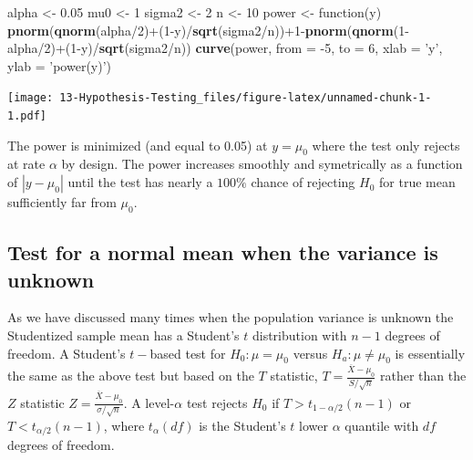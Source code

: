 \documentclass[]{book}
\newenvironment{Shaded}{\begin{snugshade}}{\end{snugshade}}
\newcommand{\KeywordTok}[1]{\textcolor[rgb]{0.13,0.29,0.53}{\textbf{{#1}}}}
\newcommand{\DataTypeTok}[1]{\textcolor[rgb]{0.13,0.29,0.53}{{#1}}}
\newcommand{\DecValTok}[1]{\textcolor[rgb]{0.00,0.00,0.81}{{#1}}}
\newcommand{\FloatTok}[1]{\textcolor[rgb]{0.00,0.00,0.81}{{#1}}}
\newcommand{\StringTok}[1]{\textcolor[rgb]{0.31,0.60,0.02}{{#1}}}
\newcommand{\NormalTok}[1]{{#1}}
\begin{document}
\begin{Shaded}
\begin{Highlighting}[]
\NormalTok{alpha <-}\StringTok{ }\FloatTok{0.05}
\NormalTok{mu0 <-}\StringTok{ }\DecValTok{1}
\NormalTok{sigma2 <-}\StringTok{ }\DecValTok{2}
\NormalTok{n <-}\StringTok{ }\DecValTok{10}
\NormalTok{power <-}\StringTok{ }\NormalTok{function(y) }\KeywordTok{pnorm}\NormalTok{(}\KeywordTok{qnorm}\NormalTok{(alpha/}\DecValTok{2}\NormalTok{)+(}\DecValTok{1}\NormalTok{-y)/}\KeywordTok{sqrt}\NormalTok{(sigma2/n))+}\DecValTok{1}\NormalTok{-}\KeywordTok{pnorm}\NormalTok{(}\KeywordTok{qnorm}\NormalTok{(}\DecValTok{1}\NormalTok{-alpha/}\DecValTok{2}\NormalTok{)+(}\DecValTok{1}\NormalTok{-y)/}\KeywordTok{sqrt}\NormalTok{(sigma2/n))}
\KeywordTok{curve}\NormalTok{(power, }\DataTypeTok{from =} \NormalTok{-}\DecValTok{5}\NormalTok{, }\DataTypeTok{to =} \DecValTok{6}\NormalTok{, }\DataTypeTok{xlab =} \StringTok{'y'}\NormalTok{, }\DataTypeTok{ylab =} \StringTok{'power(y)'}\NormalTok{)  }
\end{Highlighting}
\end{Shaded}

\texttt{[image: 13-Hypothesis-Testing\_files/figure-latex/unnamed-chunk-1-1.pdf]}

The power is minimized (and equal to 0.05) at \(y = \mu_0\) where the
test only rejects at rate \(\alpha\) by design. The power increases
smoothly and symetrically as a function of \(|y-\mu_0|\) until the test
has nearly a \(100\%\) chance of rejecting \(H_0\) for true mean
sufficiently far from \(\mu_0\).

\subsection{Test for a normal mean when the variance is
unknown}\label{test-for-a-normal-mean-when-the-variance-is-unknown}

As we have discussed many times when the population variance is unknown
the Studentized sample mean has a Student's \(t\) distribution with
\(n-1\) degrees of freedom. A Student's \(t-\)based test for
\(H_0:\mu = \mu_0\) versus \(H_a:\mu\ne\mu_0\) is essentially the same
as the above test but based on the \(T\) statistic,
\(T = \frac{\overline X - \mu_0}{S/\sqrt{n}}\) rather than the \(Z\)
statistic \(Z = \frac{\overline X - \mu_0}{\sigma/\sqrt{n}}\). A
level-\(\alpha\) test rejects \(H_0\) if \(T > t_{1-\alpha/2}(n-1)\) or
\(T < t_{\alpha/2}(n-1)\), where \(t_\alpha(df)\) is the Student's \(t\)
lower \(\alpha\) quantile with \(df\) degrees of freedom.
\end{document}
